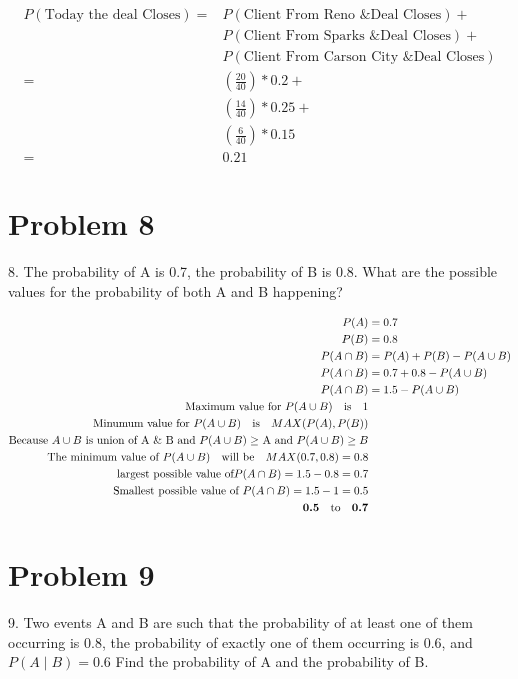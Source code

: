 \documentclass{article}
\begin{document}
	\begin{align*}
	P(\text{Today the deal Closes}) = & P(\text{Client From Reno \& Deal Closes}) + \\
	& P(\text{Client From Sparks \& Deal Closes}) + \\
	& P(\text{Client From Carson City \& Deal Closes}) \\
	= & (\frac{20}{40}) * 0.2 + \\
	& (\frac{14}{40}) * 0.25 + \\
	& (\frac{6}{40}) * 0.15 \\
	=& \boldsymbol{0.21}
	\end{align*}

	\section*{Problem 8} 
	8. The probability of A is 0.7, the probability of B is 0.8. What are the possible values for the probability of both A and B happening?
	
	\begin{align*}
	P(A) &= 0.7 \\
	P(B) &= 0.8 \\
    P(A \cap B) &= P(A) + P(B) - P(A \cup B) \\
	P(A \cap B) &= 0.7 + 0.8 - P(A \cup B)\\
    P(A \cap B) &= 1.5 - P(A \cup B)\\
	 \text{Maximum value for }P(A \cup B) \text{\quad is} \quad1\\
	 \text{Minumum value for } P(A \cup B) \text{\quad is} \quad MAX(P(A), P(B))  \\
	\text{Because $A \cup B$ is union of A \& B and $P(A \cup B) \geq $ A and  $P(A \cup B) \geq B$}   \\
	\text{The minimum value of }P(A \cup B)  \quad \text{will be} \quad MAX(0.7, 0.8)  = 0.8\\
	\text{largest possible value of}  P(A \cap B) = 1.5 - 0.8 = 0.7\\
	\text{Smallest possible value of } P(A \cap B) = 1.5 - 1 = 0.5\\              
	\boldsymbol{0.5 \quad \text{to} \quad 0.7}
	\end{align*}

	\section*{Problem 9} 
	9. Two events A and B are such that the probability of at least one of them occurring is 0.8, the probability of exactly one of them occurring is 0.6, and  $P(A\mid B) = 0.6$  Find the probability of A and the probability of B. 
	
\end{document}
